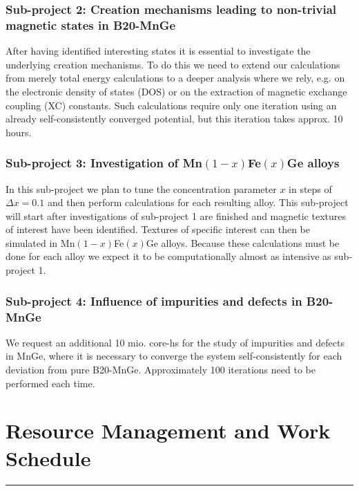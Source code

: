 \documentclass [a4paper, 12pt]{article}
\begin{document}
\subsubsection{Sub-project 2: Creation mechanisms leading to non-trivial magnetic states in B20-MnGe}
After having identified interesting states it is essential to investigate the underlying creation mechanisms.
To do this we need to extend our calculations from merely total energy calculations to 
a deeper analysis where we rely, e.g. on the electronic density of states (DOS) or on the extraction
of magnetic exchange coupling (XC) constants. 
Such calculations require only one iteration using an already self-consistently converged potential, but
this iteration takes approx. 10 hours.

\subsubsection{Sub-project 3: Investigation of Mn$(1-x)$Fe$(x)$Ge alloys}
In this sub-project we plan to tune the concentration parameter $x$ in steps of
$\Delta x = 0.1$ and then perform calculations for each resulting alloy. This
sub-project will start after investigations of sub-project 1 are finished
and magnetic textures of interest have been identified.
Textures of specific interest can then be simulated in Mn$(1-x)$Fe$(x)$Ge alloys.
Because these calculations must be done for each alloy we expect
it to be computationally almost as intensive as sub-project 1.

\subsubsection{Sub-project 4: Influence of impurities and defects in B20-MnGe}
We request an additional 10 mio. core-hs for the study of impurities and defects in MnGe,
where it is necessary to converge the system self-consistently for each
deviation from pure B20-MnGe. Approximately 100 iterations need
to be performed each time.




\section{Resource Management and Work Schedule}
\rule{\textwidth}{0.4pt}\\
\end{document}
